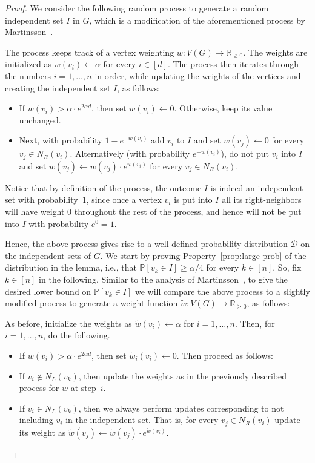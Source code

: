 \documentclass[10pt]{amsart}
\theoremstyle{definition}
\begin{document}
\begin{proof}
    We consider the following random process to generate a random independent set $I$ in $G$, which is a modification of the aforementioned process by Martinsson~\cite{martinsson}.

    The process keeps track of a vertex weighting $w:V(G)\rightarrow \mathbb{R}_{\ge 0}$. The weights are initialized as $w(v_i)\leftarrow \alpha$ for every $i\in [d]$. The process then iterates through the numbers $i=1,\ldots,n$ in order, while updating the weights of the vertices and creating the independent set $I$, as follows:
    \begin{itemize}
        \item If $w(v_i) > \alpha \cdot e^{2 \alpha d}$, then set $w(v_i) \leftarrow 0$. Otherwise, keep its value unchanged.
        \item Next, with probability $1-e^{-w(v_i)}$ add $v_i$ to $I$ and set $w(v_j) \leftarrow 0$ for every $v_j\in N_R(v_i)$. Alternatively (with probability $e^{-w(v_i)}$), do not put $v_i$ into $I$ and set $w(v_j) \leftarrow w(v_j) \cdot e^{w(v_i)}$ for every $v_j\in N_R(v_i)$. 
    \end{itemize}

Notice that by definition of the process, the outcome $I$ is indeed an independent set with probability~$1$, since once a vertex $v_i$ is put into $I$ all its right-neighbors will have weight $0$ throughout the rest of the process, and hence will not be put into $I$ with probability $e^{0}=1$. 

Hence, the above process gives rise to a well-defined probability distribution $\mathcal{D}$ on the independent sets of $G$. We start by proving Property~\ref{prop:large-prob} of the distribution in the lemma, i.e., that $\mathbb{P}[v_k \in I]\ge \alpha / 4$ for every $k\in [n]$. So, fix $k\in [n]$ in the following. Similar to the analysis of Martinsson~\cite{martinsson}, to give the desired lower bound on $\mathbb{P}[v_k\in I]$ we will compare the above process to a slightly modified process to generate a weight function $\tilde{w}:V(G)\rightarrow \mathbb{R}_{\ge 0}$, as follows:

As before, initialize the weights as $\tilde{w}(v_i)\leftarrow \alpha$ for $i=1,\ldots,n$. Then, for $i=1,\ldots,n$, do the following.
\begin{itemize}
    \item If $\tilde{w}(v_i) > \alpha \cdot e^{2 \alpha d}$, then set $\tilde{w}_i(v_i) \leftarrow 0$. Then proceed as follows:
    \item If $v_i\notin N_L(v_k)$, then update the weights as in the previously described process for $w$ at step~$i$.
    \item If $v_i\in N_L(v_k)$, then we always perform updates corresponding to not including $v_i$ in the independent set. That is, for every $v_j\in N_R(v_i)$ update its weight as $\tilde{w}(v_j)\leftarrow \tilde{w}(v_j)\cdot e^{\tilde{w}(v_i)}$.
\end{itemize}


\end{proof}
\end{document}
